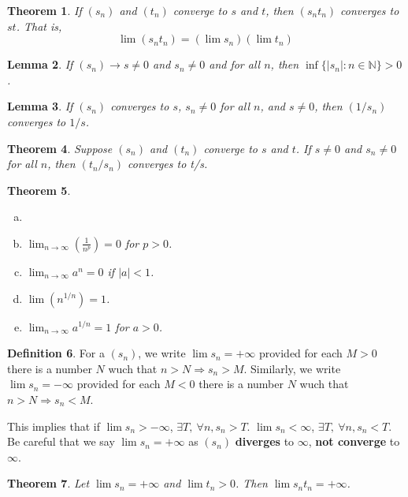 \documentclass[12pt, lettersize]{book}
\theoremstyle{plain}
\newtheorem{thm}{Theorem}[section]
\newtheorem{lem}[thm]{Lemma}
\theoremstyle{definition}
\newtheorem{dfn}[thm]{Definition}
\theoremstyle{remark}
\newcommand{\N}{\mathbb{N}}
\begin{document}
	\begin{thm}\label{def:multiplication}
		If $(s_n)$ and $(t_n)$ converge to $s$ and $t$, then $(s_nt_n)$ converges to $st$. That is,
		\begin{displaymath}
			\lim(s_nt_n)=(\lim s_n)(\lim t_n)
		\end{displaymath} 
	\end{thm}
	
	\begin{lem}
		If $(s_n)\rightarrow s\neq0$ and $s_n\neq0$ and  for all $n$, then $\inf\{|s_n|: n\in\N\}>0$.
	\end{lem}
	
	\begin{lem}\label{def:reciprocal}
		If $(s_n)$ converges to $s$, $s_n\neq 0$ for all $n$, and $s\neq 0$, then $(1/s_n)$ converges to $1/s$.
	\end{lem}
	
	
	\begin{thm}
		Suppose $(s_n)$ and $(t_n)$ converge to $s$ and $t$. If $s\neq 0$ and $s_n\neq 0$ for all $n$, then $(t_n/s_n)$ converges to t/s.
	\end{thm}
	
	\begin{thm}
		\begin{enumerate}[(a)]
			\item[]
			\item $\lim_{n\rightarrow\infty}(\frac{1}{n^p})=0$ for $p>0$.
			\item $\lim_{n\rightarrow\infty}a^n=0$ if $|a|<1$.
			\item $\lim(n^{1/n})=1$.
			\item $\lim_{n\rightarrow\infty}a^{1/n}=1$ for $a>0$.
		\end{enumerate}
	\end{thm}
	\newpage
	
	\begin{dfn}
		For a $(s_n)$, we write $\lim s_n=+\infty$ provided for each $M>0$ there is a number $N$ wuch that $n>N\Rightarrow s_n>M$. Similarly, we write $\lim s_n=-\infty$ provided for each $M<0$ there is a number $N$ wuch that $n>N\Rightarrow s_n<M$.
	\end{dfn}
	This implies that if $\lim s_n>-\infty$, $\exists T,\ \forall n, s_n>T$. $\lim s_n<\infty$, $\exists T,\ \forall n, s_n<T$. 
	Be careful that we say $\lim s_n=+\infty$ as $(s_n)$ \textbf{diverges} to $\infty$, \textbf{not converge} to $\infty$.
	
	\begin{thm}
		Let $\lim s_n=+\infty$ and $\lim t_n>0$. Then $\lim s_nt_n=+\infty$.
	\end{thm}
	
\end{document}
